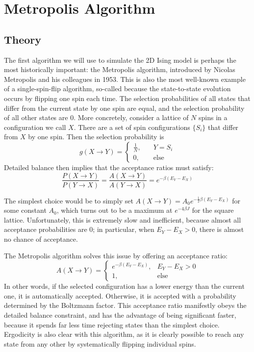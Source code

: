 \documentclass[twocolumn,aps,prl]{revtex4-1} %
\begin{document}
\section{Metropolis Algorithm}
\subsection{Theory}
The first algorithm we will use to simulate the 2D Ising model is perhaps the most historically important: the Metropolis algorithm, introduced by Nicolas Metropolis and his colleagues in 1953. This is also the most well-known example of a single-spin-flip algorithm, so-called because the state-to-state evolution occurs by flipping one spin each time. The selection probabilities of all states that differ from the current state by one spin are equal, and the selection probability of all other states are 0. More concretely, consider a lattice of $N$ spins in a configuration we call $X$. There are a set of spin configurations $\{S_i\}$ that differ from $X$ by one spin. Then the selection probability is
\begin{equation}
g(X \to Y) = \begin{cases}
\frac{1}{N},& \quad Y = S_i \\
0,& \quad \text{else}
\end{cases}
\end{equation}
Detailed balance then implies that the acceptance ratios must satisfy:
\begin{equation}
\frac{P(X \to Y)}{P(Y \to X)} = \frac{A(X \to Y)}{A(Y \to X)} = e^{-\beta(E_Y - E_X)}
\end{equation}

The simplest choice would be to simply set $A(X \to Y) = A_0e^{-\frac{1}{2}\beta(E_Y - E_X)}$ for some constant $A_0$, which turns out to be a maximum at $e^{-4\beta J}$ for the square lattice. Unfortunately, this is extremely slow and inefficient, because almost all acceptance probabilities are 0; in particular, when $E_Y - E_X > 0$, there is almost no chance of acceptance. 

The Metropolis algorithm solves this issue by offering an acceptance ratio:
\begin{equation}
A(X \to Y) = \begin{cases}
e^{-\beta(E_Y - E_X)}, & E_Y - E_X > 0 \\
1, & \text{else}
\end{cases}
\end{equation}
In other words, if the selected configuration has a lower energy than the current one, it is automatically accepted. Otherwise, it is accepted with a probability determined by the Boltzmann factor. This acceptance ratio manifestly obeys the detailed balance constraint, and has the advantage of being significant faster, because it spends far less time rejecting states than the simplest choice. Ergodicity is also clear with this algorithm, as it is clearly possible to reach any state from any other by systematically flipping individual spins.
\end{document}
